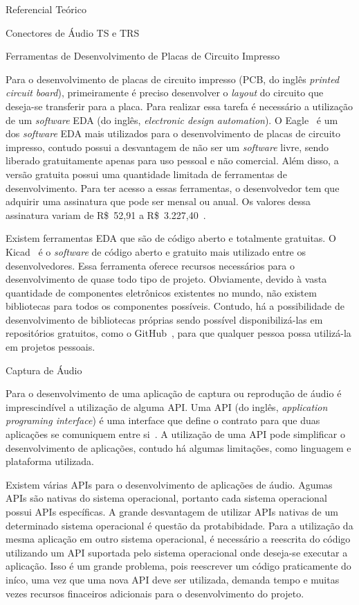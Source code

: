 \begin{chapter}{Referencial Teórico}
\begin{section}{Conectores de Áudio TS e TRS}
\end{section}


\begin{section}{Ferramentas de Desenvolvimento de Placas de Circuito Impresso}

Para o desenvolvimento de placas de circuito impresso (PCB, do inglês
\textit{printed circuit board}), primeiramente é
preciso desenvolver o \textit{layout} do circuito que deseja-se transferir
para a placa. Para realizar essa tarefa é necessário a utilização de um
\textit{software} EDA (do inglês, \textit{electronic design automation}). O
Eagle~\cite{eagle} é um dos \textit{software} EDA mais utilizados para o
desenvolvimento de placas de circuito impresso, contudo possui a desvantagem de
não ser um \textit{software} livre, sendo liberado gratuitamente apenas para uso
pessoal e não comercial. Além disso, a versão gratuita possui uma quantidade
limitada de ferramentas de desenvolvimento. Para ter acesso a essas ferramentas,
o desenvolvedor tem que adquirir uma assinatura que pode ser mensal ou anual. Os
valores dessa assinatura variam de R\$~52,91 a
R\$~3.227,40~\cite{EagleAssinatura}. 
 
Existem ferramentas EDA que são de código aberto e totalmente gratuitas. O
Kicad~\cite{kicad} é o  \textit{software} de código aberto e gratuito mais
utilizado entre os desenvolvedores. Essa ferramenta oferece recursos necessários
para o desenvolvimento de quase todo tipo de projeto. Obviamente, devido à vasta
quantidade de componentes eletrônicos existentes no mundo, não existem
bibliotecas para todos os componentes possíveis. Contudo, há a possibilidade
de desenvolvimento de bibliotecas próprias sendo possível disponibilizá-las em
repositórios gratuitos, como o GitHub~\cite{github}, para que qualquer pessoa
possa utilizá-la em projetos pessoais.  
\end{section}


\begin{section}{Captura de Áudio}

Para o desenvolvimento de uma aplicação de captura ou reprodução de áudio é
imprescindível a utilização de alguma API. Uma API (do inglês,
\textit{application programing interface}) é uma interface que define o contrato
para que duas aplicações se comuniquem entre si~\cite{API17}. A utilização de
uma API pode simplificar o desenvolvimento de aplicações, contudo há algumas
limitações, como linguagem e plataforma utilizada. 

Existem várias APIs para o desenvolvimento de aplicações de áudio. Agumas APIs são
nativas do sistema operacional, portanto cada sistema operacional possui APIs
específicas. A grande desvantagem de utilizar APIs nativas de um determinado
sistema operacional é questão da protabibidade. Para a utilização da mesma aplicação em outro sistema
operacional, é necessário a reescrita do código utilizando um API suportada pelo
sistema operacional onde deseja-se executar a aplicação. Isso é um grande
problema, pois reescrever um código praticamente do iníco, uma vez que uma nova
API deve ser utilizada, demanda tempo e muitas vezes recursos finaceiros
adicionais para o desenvolvimento do projeto.



\end{section}
\end{chapter}
